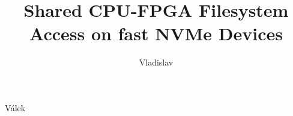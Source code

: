 
\usepackage[
  english,			%
  master,			%
  center,			%
%
]{thesis}   %


\author[Bc.]{Vladislav}{Válek}




\title{Shared CPU-FPGA Filesystem Access on fast NVMe Devices}

